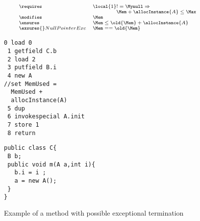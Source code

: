 \begin{figure}[!hbp]
$${\scriptsize
\begin{array}{ll}
 \requires &  \local{1} != \Mynull \Rightarrow  \\
           & \phantom{\local{1}} \Mem +  \allocInstance{A} \le \Max \\
  \modifies & \Mem \\
  \ensures  & \Mem \le \old{\Mem} +  \allocInstance{A} \\
  \exsures{} NullPointerExc  & \Mem == \old{\Mem}   \\
\end{array}}$$


\begin{minipage}[t]{90mm}
{\scriptsize
\begin{lstlisting}[frame=trbl]
 0 load 0
 1 getfield C.b
 2 load 2
 3 putfield B.i
 4 new A 
//set MemUsed = 
  MemUsed +
  allocInstance(A)
 5 dup
 6 invokespecial A.init
 7 store 1
 8 return
\end{lstlisting}
}
\end{minipage}


\begin{minipage}[t]{90mm}
{\scriptsize
\begin{lstlisting}[frame=trbl]
public class C{
 B b;
 public void m(A a,int i){
   b.i = i ;
   a = new A();
 }
}
\end{lstlisting}
}
\end{minipage}

\caption{\sc Example of a method with possible exceptional termination}
\label{excMeth}
\end{figure}
